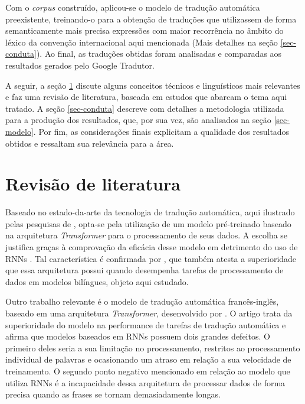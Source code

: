 \documentclass[portuguese]{textolivre}
\begin{document}
Com o \textit{corpus} construído, aplicou-se o modelo de tradução automática preexistente, treinando-o para a obtenção de traduções que utilizassem de forma semanticamente mais precisa expressões com maior recorrência no âmbito do léxico da convenção internacional aqui mencionada (Mais detalhes na seção \ref{sec-conduta}). Ao final, as traduções obtidas foram analisadas e comparadas aos resultados gerados pelo Google Tradutor.

A seguir, a seção \ref{sec-normas} discute alguns conceitos técnicos e linguísticos mais relevantes e faz uma revisão de literatura, baseada em estudos que abarcam o tema aqui tratado. A seção \ref{sec-conduta} descreve com detalhes a metodologia utilizada para a produção dos resultados, que, por sua vez, são analisados na seção \ref{sec-modelo}. Por fim, as considerações finais explicitam a qualidade dos resultados obtidos e ressaltam sua relevância para a área.

\section{Revisão de literatura}\label{sec-normas}
Baseado no estado-da-arte da tecnologia de tradução automática, aqui ilustrado pelas pesquisas de \textcite{lakew_comparison_2018,banitz_machine_2020,tian_french--english_2022,iosifova_techniques_2020,kimera_building_2022}, opta-se pela utilização de um modelo pré-treinado baseado na arquitetura \textit{Transformer} para o processamento de seus dados. A escolha se justifica graças à comprovação da eficácia desse modelo em detrimento do uso de RNNs \cite{vaswani_attention_2017,wolf_huggingfaces_2020,raffel_exploring_2020}. Tal característica é confirmada por \textcite{lakew_comparison_2018}, que também atesta a superioridade que essa arquitetura possui quando desempenha tarefas de processamento de dados em modelos bilíngues, objeto aqui estudado.

Outro trabalho relevante é o modelo de tradução automática francês-inglês, baseado em uma arquitetura \textit{Transformer}, desenvolvido por \textcite{tian_french--english_2022}. O artigo \cite{tian_french--english_2022} trata da superioridade do modelo na performance de tarefas de tradução automática e afirma que modelos baseados em RNNs possuem dois grandes defeitos. O primeiro deles seria a sua limitação no processamento, restritos ao processamento individual de palavras e ocasionando um atraso em relação a sua velocidade de treinamento. O segundo ponto negativo mencionado em relação ao modelo que utiliza RNNs é a incapacidade dessa arquitetura de processar dados de forma precisa quando as frases se tornam demasiadamente longas.
\end{document}

